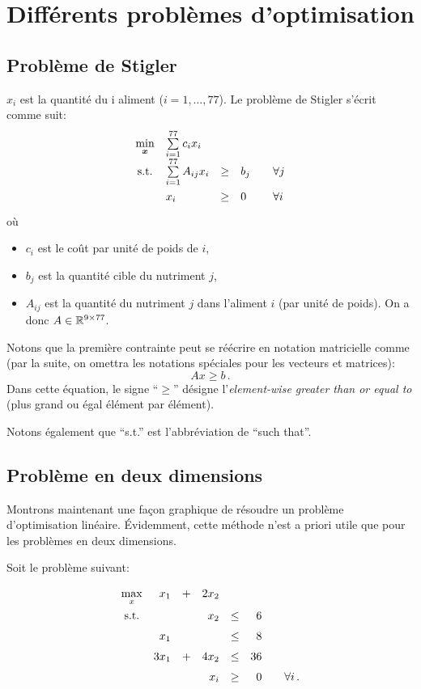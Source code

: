 \section{Différents problèmes d'optimisation}

\subsection{Problème de Stigler}

	$x_i$ est la quantité du i\ieme{} aliment ($i = 1,\dots,77$).
	Le problème de Stigler s'écrit comme suit:
	\begin{equation*}
	\renewcommand{\arraystretch}{1.5}
	\begin{array}{c@{\quad} l c l@{\qquad} l}
		\min\limits_{\bm{x}} & \sum\limits_{i = 1}^{77} c_i x_i & & & \\
		\textnormal{s.t.} & \sum\limits_{i = 1}^{77} A_{ij} x_i & \ge & b_j & \forall j\\
		& x_i & \ge & 0 & \forall i
	\end{array}
	\end{equation*}
	où
	\begin{itemize}
		\item $c_i$ est le coût par unité de poids de $i$,
		\item $b_j$ est la quantité cible du nutriment $j$,
		\item $A_{ij}$ est la quantité du nutriment $j$
		dans l'aliment $i$ (par unité de poids).
		On a donc $A \in \mathbb{R}^{9 \times 77}$.
	\end{itemize}

	Notons que la première contrainte
	peut se réécrire en notation matricielle comme
	(par la suite,
	on omettra les notations spéciales pour les vecteurs et matrices):
	\[
	Ax \ge b\,.
	\]
	Dans cette équation,
	le signe ``$\ge$'' désigne
	l'\emph{element-wise greater than or equal to}
	(plus grand ou égal élément par élément).

	Notons également que ``s.t.'' est l'abbréviation de ``such that''.

\subsection{Problème en deux dimensions}

	Montrons maintenant une façon graphique
	de résoudre un problème d'optimisation linéaire.
	Évidemment, cette méthode n'est a priori utile
	que pour les problèmes en deux dimensions.

	Soit le problème suivant:
	\begin{equation*}
	\begin{array}{c@{\quad} r c r c r@{\qquad} l}
		\max\limits_{x} & x_1 & + & 2 x_2 & & &\\
		\textnormal{s.t.} & & & x_2 & \le & 6 &\\
		& x_1 & & & \le & 8 &\\
		& 3 x_1 & + & 4 x_2 & \le & 36 & \\
		& & & x_i & \ge & 0 & \forall i\,.
	\end{array}
	\end{equation*}

